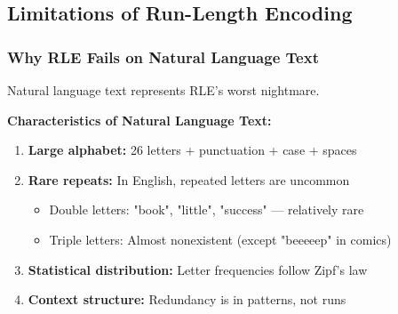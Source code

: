 \subsection{Limitations of Run-Length Encoding}

\subsubsection{Why RLE Fails on Natural Language Text}

Natural language text represents RLE's worst nightmare.

\begin{importantbox}
\textbf{Characteristics of Natural Language Text:}

\begin{enumerate}
    \item \textbf{Large alphabet:} 26 letters + punctuation + case + spaces
    \item \textbf{Rare repeats:} In English, repeated letters are uncommon
    \begin{itemize}
        \item Double letters: "book", "little", "success" — relatively rare
        \item Triple letters: Almost nonexistent (except "beeeeep" in comics)
    \end{itemize}
    \item \textbf{Statistical distribution:} Letter frequencies follow Zipf's law
    \item \textbf{Context structure:} Redundancy is in patterns, not runs
\end{enumerate}
\end{importantbox}

